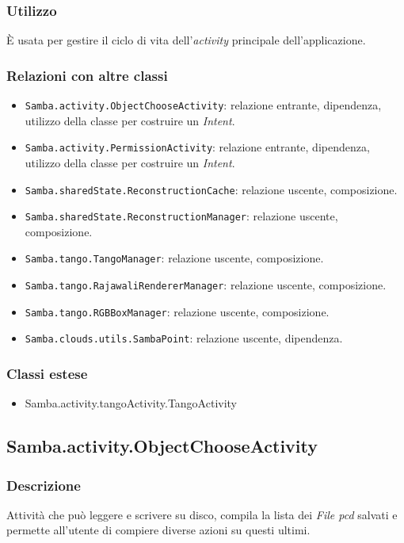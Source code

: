 \subsubsection{Utilizzo}
È usata per gestire il ciclo di vita dell'\emph{activity} principale dell'applicazione.
\subsubsection{Relazioni con altre classi}
\begin{itemize}
	\item \texttt{Samba.activity.ObjectChooseActivity}: relazione entrante, dipendenza, utilizzo della classe per costruire un \emph{Intent}.
	\item \texttt{Samba.activity.PermissionActivity}: relazione entrante, dipendenza, utilizzo della classe per costruire un \emph{Intent}.
	\item \texttt{Samba.sharedState.ReconstructionCache}: relazione uscente, composizione.
	\item \texttt{Samba.sharedState.ReconstructionManager}: relazione uscente, composizione.	
	\item \texttt{Samba.tango.TangoManager}: relazione uscente, composizione.
	\item \texttt{Samba.tango.RajawaliRendererManager}: relazione uscente, composizione.
	\item \texttt{Samba.tango.RGBBoxManager}: relazione uscente, composizione.
	\item \texttt{Samba.clouds.utils.SambaPoint}: relazione uscente, dipendenza.
\end{itemize}
\subsubsection{Classi estese}
\begin{itemize}
	\item Samba.activity.tangoActivity.TangoActivity
\end{itemize}

\subsection{Samba.activity.ObjectChooseActivity}
\subsubsection{Descrizione}
Attività che può leggere e scrivere su disco, compila la lista dei \emph{File pcd} salvati e permette all'utente di compiere diverse azioni su questi ultimi.
